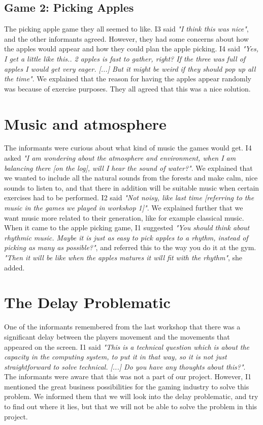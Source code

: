 \subsection{Game 2: Picking Apples}

The picking apple game they all seemed to like. I3 said \emph{"I think this was nice"}, and the other informants agreed. However, they had some concerns about how the apples would appear and how they could plan the apple picking. I4 said \emph{"Yes, I get a little like this.. 2 apples is fast to gather, right? If the three was full of apples I would get very eager. [...] But it might be weird if they should pop up all the time"}.  We explained that the reason for having the apples appear randomly was because of exercise purposes. They all agreed that this was a nice solution. 

\section{Music and atmosphere}

The informants were curious about what kind of music the games would get. I4 asked \emph{"I am wondering about the atmosphere and environment, when I am balancing there [on the log], will I hear the sound of water?"}. We explained that we wanted to include all the natural sounds from the forests and make calm, nice sounds to listen to, and that there in addition will be suitable music when certain exercises had to be performed. I2 said \emph{"Not noisy, like last time [referring to the music in the games we played in workshop 1]"}. We explained further that we want music more related to their generation, like for example classical music. When it came to the apple picking game, I1 suggested \emph{"You should think about rhythmic music. Maybe it is just as easy to pick apples to a rhythm, instead of picking as many as possible?"}, and referred this to the way you do it at the gym. \emph{"Then it will be like when the apples matures it will fit with the rhythm"}, she added. 

\section{The Delay Problematic}

One of the informants remembered from the last workshop that there was a significant delay between the players movement and the movements that appeared on the screen. I1 said \emph{"This is a technical question which is about the capacity in the computing system, to put it in that way, so it is not just straightforward to solve technical. [...] Do you have any thoughts about this?"}. The informants were aware that this was not a part of our project. However, I1 mentioned the great business possibilities for the gaming industry to solve this problem. We informed them that we will look into the delay problematic, and try to find out where it lies, but that we will not be able to solve the problem in this project. 

